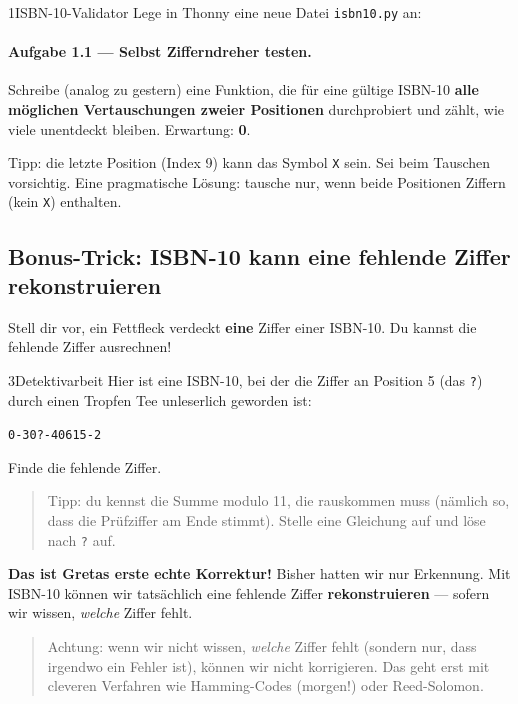 \begin{pythoneinheit}{1}{ISBN-10-Validator}
Lege in Thonny eine neue Datei \texttt{isbn10.py} an:


\paragraph{Aufgabe 1.1 — Selbst Zifferndreher testen.}
Schreibe (analog zu gestern) eine Funktion, die für eine gültige
ISBN-10 \textbf{alle möglichen Vertauschungen zweier Positionen}
durchprobiert und zählt, wie viele unentdeckt bleiben. Erwartung:
\textbf{0}.

Tipp: die letzte Position (Index 9) kann das Symbol \texttt{X} sein.
Sei beim Tauschen vorsichtig. Eine pragmatische Lösung: tausche nur,
wenn beide Positionen Ziffern (kein \texttt{X}) enthalten.
\end{pythoneinheit}

\subsection*{Bonus-Trick: ISBN-10 kann eine fehlende Ziffer rekonstruieren}

Stell dir vor, ein Fettfleck verdeckt \textbf{eine} Ziffer einer
ISBN-10. Du kannst die fehlende Ziffer ausrechnen!

\begin{bleistiftuebung}{3}{Detektivarbeit}
Hier ist eine ISBN-10, bei der die Ziffer an Position 5 (das
\texttt{?}) durch einen Tropfen Tee unleserlich geworden ist:

\begin{center}
\texttt{0-30?-40615-2}
\end{center}

Finde die fehlende Ziffer.

\begin{quote}
Tipp: du kennst die Summe modulo 11, die rauskommen muss (nämlich so,
dass die Prüfziffer am Ende stimmt). Stelle eine Gleichung auf und
löse nach \texttt{?} auf.
\end{quote}
\end{bleistiftuebung}

\textbf{Das ist Gretas erste echte Korrektur!} Bisher hatten wir nur
Erkennung. Mit ISBN-10 können wir tatsächlich eine fehlende Ziffer
\textbf{rekonstruieren} — sofern wir wissen, \emph{welche} Ziffer
fehlt.

\begin{quote}
Achtung: wenn wir nicht wissen, \emph{welche} Ziffer fehlt (sondern
nur, dass irgendwo ein Fehler ist), können wir nicht korrigieren. Das
geht erst mit cleveren Verfahren wie Hamming-Codes (morgen!) oder
Reed-Solomon.
\end{quote}


